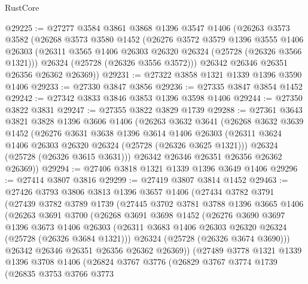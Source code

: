 \begin{lexlean}{RustCore}
\begin{coremodule}
@29225 := @27277
    @3584
    @3861
    @3868
    @1396
    @3547
    @1406
    (@26263
      @3573
      @3582
      (@26268
        @3573
        @3580
        @1452
        (@26276
          @3572
          @3579
          @1396
          @3555
          @1406
          @26303
          (@26311 @3565 @1406 @26303 @26320 @26324 (@25728 (@26326 @3566 @1321)))
          @26324
          (@25728 (@26326 @3556 @3572)))
        @26342
        @26346
        @26351
        @26356
        @26362
        @26369))
@29231 := @27322 @3858 @1321 @1339 @1396 @3590 @1406
@29233 := @27330 @3847 @3856
@29236 := @27335 @3847 @3854 @1452
@29242 := @27342 @3833 @3846 @3853 @1396 @3598 @1406
@29244 := @27350 @3822 @3831
@29247 := @27355 @3822 @3829 @1739
@29288 := @27361
    @3643
    @3821
    @3828
    @1396
    @3606
    @1406
    (@26263
      @3632
      @3641
      (@26268
        @3632
        @3639
        @1452
        (@26276
          @3631
          @3638
          @1396
          @3614
          @1406
          @26303
          (@26311 @3624 @1406 @26303 @26320 @26324 (@25728 (@26326 @3625 @1321)))
          @26324
          (@25728 (@26326 @3615 @3631)))
        @26342
        @26346
        @26351
        @26356
        @26362
        @26369))
@29294 := @27406 @3818 @1321 @1339 @1396 @3649 @1406
@29296 := @27414 @3807 @3816
@29299 := @27419 @3807 @3814 @1452
@29463 := @27426
    @3793
    @3806
    @3813
    @1396
    @3657
    @1406
    (@27434
      @3782
      @3791
      (@27439
        @3782
        @3789
        @1739
        (@27445
          @3702
          @3781
          @3788
          @1396
          @3665
          @1406
          (@26263
            @3691
            @3700
            (@26268
              @3691
              @3698
              @1452
              (@26276
                @3690
                @3697
                @1396
                @3673
                @1406
                @26303
                (@26311 @3683 @1406 @26303 @26320 @26324 (@25728 (@26326 @3684 @1321)))
                @26324
                (@25728 (@26326 @3674 @3690)))
              @26342
              @26346
              @26351
              @26356
              @26362
              @26369))
          (@27489
            @3778
            @1321
            @1339
            @1396
            @3708
            @1406
            (@26824
              @3767
              @3776
              (@26829
                @3767
                @3774
                @1739
                (@26835
                  @3753
                  @3766
                  @3773

\end{coremodule}
\end{lexlean}
